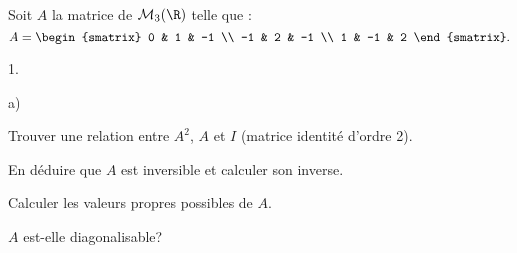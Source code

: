 \documentclass[11pt]{article}%
\begin{document}
\begin{exerciceSP}~\\
  Soit $A$ la matrice de $\mathcal{M}_3 (\R)$ telle que :
  \[
  A = 
  \begin{smatrix} 
    0 & 1 & -1 \\ 
    -1 & 2 & -1 \\ 
    1 & -1 & 2 
  \end{smatrix}. 
  \] 
  \begin{noliste}{1.}
    \setlength{\itemsep}{2mm}
  \item \begin{noliste}{a)}
    \setlength{\itemsep}{2mm}
    \item Trouver une relation entre $A^2$, $A$ et $I$ (matrice
      identité d'ordre 2).
    \item En déduire que $A$ est inversible et calculer son inverse.
    \end{noliste}
  \item Calculer les valeurs propres possibles de $A$.
  \item $A$ est-elle diagonalisable?
  \end{noliste}
\end{exerciceSP}

\newpage
\end{document}
